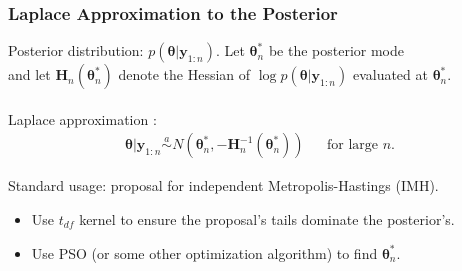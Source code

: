 \documentclass[xcolor=dvipsnames]{beamer}
\begin{document}



\begin{frame}
\frametitle{Laplace Approximation to the Posterior}
Posterior distribution: $p(\bm{\theta}|\bm{y}_{1:n})$. Let $\bm{\theta}^*_n$ be the posterior mode\\
 and let $\bm{H}_n(\bm{\theta}^*_n)$ denote the Hessian of $\log p(\bm{\theta}|\bm{y}_{1:n})$ evaluated at $\bm{\theta}^*_n$.\\~\\

Laplace approximation \citep[Sections~7.4.2~and~7.4.3]{schervish1997theory}: 
\begin{align*}
\bm{\theta}|\bm{y}_{1:n} \stackrel{a}{\sim} N(\bm{\theta}_n^*, -\bm{H}_n^{-1}(\bm{\theta}^*_n)) && \mbox{for large }n.
\end{align*}

\vspace{0.5cm}
 Standard usage: proposal for independent Metropolis-Hastings (IMH).\\
\begin{itemize}
\item Use $t_{df}$ kernel to ensure the proposal's tails dominate the posterior's.
\item Use PSO (or some other optimization algorithm) to find $\bm{\theta}^*_n$.
\end{itemize}


\end{frame}
\end{document}
